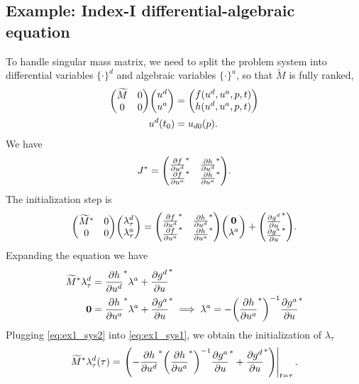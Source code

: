 \documentclass[a4paper,9pt]{article}
\theoremstyle{definition}
\theoremstyle{remark}
\begin{document}
\subsection{Example: Index-I differential-algebraic equation}
To handle singular mass matrix, we need to split the problem system into
differential variables $\{\cdot\}^d$ and algebraic
variables $\{\cdot\}^a$, so that $\widetilde{M}$ is fully ranked,
\begin{align}
  \mqty(\widetilde{M} & 0 \\ 0 & 0) \mqty(u^d\\ u^a) &= \mqty(f(u^d, u^a, p, t)
  \\ h(u^d, u^a, p, t)) \\
  u^d(t_0) &= u_{d0}(p).
\end{align}
We have
\begin{equation}
  J^* = \mqty(\pdv{f}{u^d}^* & \pdv{h}{u^d}^* \\ \pdv{f}{u^a}^* &
  \pdv{h}{u^a}^*).
\end{equation}
The initialization step is
\begin{equation}
  \mqty(\widetilde{M}^* & 0 \\ 0 & 0) \mqty(\lambda_\tau^d\\ \lambda_\tau^a) =
  \mqty(\pdv{f}{u^d}^* & \pdv{h}{u^d}^* \\ \pdv{f}{u^a}^* &
  \pdv{h}{u^a}^*) \mqty(\bm{0}\\ \lambda^a) + \mqty(\pdv{g^d}{u}^* \\
  \pdv{g^a}{u}^*).
\end{equation}
Expanding the equation we have
\begin{align}
  \widetilde{M}^* \lambda_\tau^d &= \pdv{h}{u^d}^* \lambda^a + \pdv{g^d}{u}^*
  \label{eq:ex1_sys1} \\
  \bm{0} &= \pdv{h}{u^a}^* \lambda^a + \pdv{g^a}{u}^* \implies
  \lambda^a = -\qty(\pdv{h}{u^a}^*)^{-1}\pdv{g^a}{u}^* \label{eq:ex1_sys2}
\end{align}
Plugging \cref{eq:ex1_sys2} into \cref{eq:ex1_sys1}, we obtain the
initialization of $\lambda_\tau$
\begin{equation}
  \widetilde{M}^* \lambda_\tau^d(\tau) = \eval{\qty(-\pdv{h}{u^d}^*
    \qty(\pdv{h}{u^a}^*)^{-1}\pdv{g^a}{u}^* +
  \pdv{g^d}{u}^*)}_{t=\tau}.
\end{equation}
\end{document}
